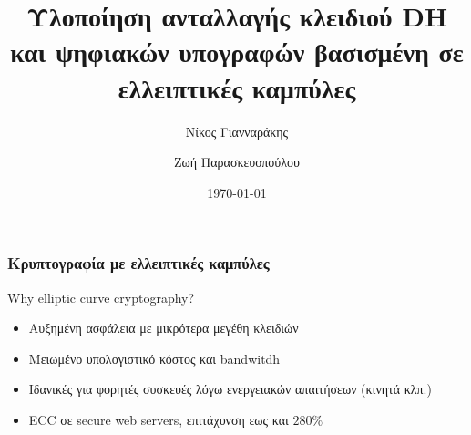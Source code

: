 \documentclass{beamer}
\title[Elliptic Curve Cryptography]{Υλοποίηση ανταλλαγής κλειδιού DH και ψηφιακών υπογραφών βασισμένη σε ελλειπτικές καμπύλες}
\author{Νίκος Γιανναράκης \and Ζωή Παρασκευοπούλου}
\institute[]
{
Σχολή Ηλεκτρολόγων Μηχανικών και Μηχανικών Υπολογιστών\\
Εθνικό Μετσόβιο Πολυτεχνείο
}
\date{\today}
\begin{document}
\begin{frame}
\titlepage
\end{frame}
\begin{frame}
\frametitle{Κρυπτογραφία με ελλειπτικές καμπύλες}
\begin{block}
{Why elliptic curve cryptography?}
\begin{itemize}
\item Αυξημένη ασφάλεια με μικρότερα μεγέθη κλειδιών
\item Μειωμένο υπολογιστικό κόστος και bandwitdh
\item Ιδανικές για φορητές συσκευές λόγω ενεργειακών απαιτήσεων (κινητά κλπ.)
\item ECC σε secure web servers, επιτάχυνση εως και $280\%$ \cite{SUN}
\end{itemize}
\end{block}
\end{frame}
\end{document}
